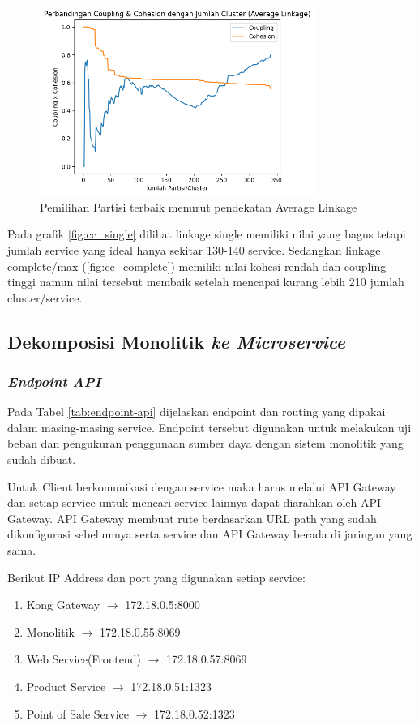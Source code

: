 \begin{figure}[h]
	\centering
	\includegraphics[width=0.8\textwidth]{img/bab_4/cc_avg.png}
	\caption{Pemilihan Partisi terbaik menurut pendekatan Average Linkage }
	\label{fig:cc_avg}
\end{figure}


Pada grafik \ref{fig:cc_single} dilihat linkage single memiliki nilai yang bagus tetapi jumlah service yang ideal hanya sekitar 130-140 service. Sedangkan linkage complete/max (\ref{fig:cc_complete}) memiliki nilai kohesi rendah dan coupling tinggi namun nilai tersebut membaik setelah mencapai kurang lebih 210 jumlah cluster/service.\\


\subsection{Dekomposisi Monolitik \textit{ ke Microservice}}

\subsubsection{\textit{Endpoint API}}
Pada Tabel \ref{tab:endpoint-api} dijelaskan endpoint dan routing yang dipakai dalam masing-masing service. Endpoint tersebut digunakan untuk melakukan uji beban dan pengukuran penggunaan sumber daya dengan sistem monolitik yang sudah dibuat.  

Untuk Client berkomunikasi dengan service maka harus melalui API Gateway dan setiap service untuk mencari service lainnya dapat diarahkan oleh API Gateway. API Gateway membuat rute berdasarkan URL path yang sudah dikonfigurasi sebelumnya serta service dan API Gateway berada di jaringan yang sama.

Berikut IP Address dan port yang digunakan setiap service:
\begin{enumerate}[leftmargin=1.3cm]
	\item Kong Gateway $\rightarrow$ 172.18.0.5:8000
	\item Monolitik $\rightarrow$ 172.18.0.55:8069
	\item Web Service(Frontend) $\rightarrow$ 172.18.0.57:8069
	\item Product Service $\rightarrow$ 172.18.0.51:1323
	\item Point of Sale Service $\rightarrow$ 172.18.0.52:1323
\end{enumerate}

